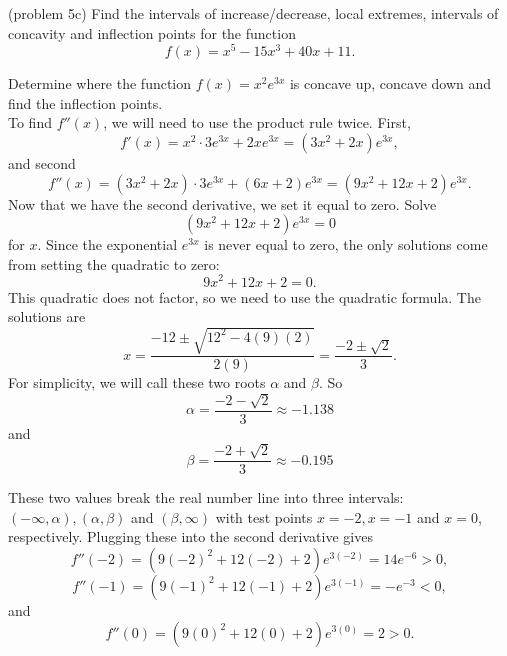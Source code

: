 \documentclass[handout]{ximera}
\begin{document}
\begin{problem}(problem 5c) Find the intervals of increase/decrease, local extremes, 
intervals of concavity and inflection points for the function
\[
f(x) = x^5 - 15x^3 + 40x + 11.
\]
\end{problem}


\begin{example}[example 6]
Determine where the function $f(x) = x^2e^{3x}$ is concave up, concave down and find 
the inflection points.\\
To find $f''(x)$, 
we will need to use the product rule twice. First, 
\[f'(x) = x^2 \cdot 3e^{3x} + 2xe^{3x} = (3x^2 + 2x)e^{3x},\]
and second
\[f''(x) = (3x^2 + 2x)\cdot 3e^{3x} + (6x + 2)e^{3x} = (9x^2 + 12x + 2)e^{3x}.\]
Now that we have the second derivative, we set it equal to zero.  Solve
\[(9x^2 + 12x + 2)e^{3x}=0\]
for $x$.
Since the exponential $e^{3x}$ is never equal to zero, the only solutions come from 
setting the quadratic to zero:
\[9x^2 + 12x + 2=0.\]
This quadratic does not factor, so we need to use the quadratic formula.
The solutions are 
\[x = \frac{-12 \pm \sqrt{12^2 - 4(9)(2)}}{2(9)} = \frac{-2 \pm \sqrt{2}}{3}.\]
For simplicity, we will call these two roots $\alpha$ and $\beta$.
So 
\[\alpha = \frac{-2 - \sqrt{2}}{3} \approx -1.138\]
and
\[\beta = \frac{-2 + \sqrt{2}}{3} \approx -0.195\]

These two values break the real number line into three intervals: $(-\infty, \alpha), 
(\alpha, \beta)$ and $(\beta, \infty)$ with test points
$x = -2, x = -1$ and $x = 0$, respectively.
Plugging these into the second derivative gives
\[f''(-2) = (9(-2)^2 + 12(-2) + 2)e^{3(-2)} = 14e^{-6} > 0,\]
\[f''(-1) = (9(-1)^2 + 12(-1) + 2)e^{3(-1)} = -e^{-3} < 0,\]
and
\[f''(0) = (9(0)^2 + 12(0) + 2)e^{3(0)} = 2 > 0.\]







\begin{image}
\end{image}
\end{example}
\end{document}
